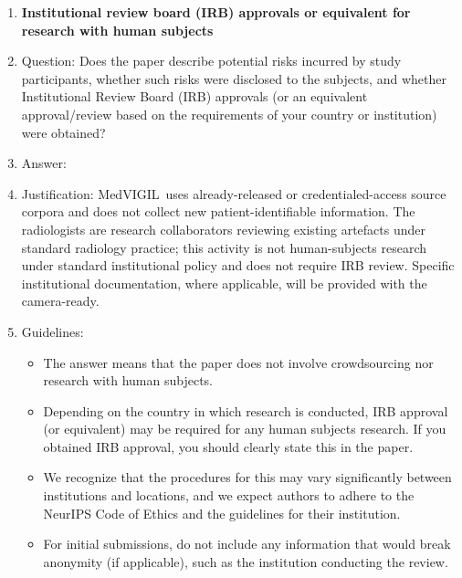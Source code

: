 \documentclass{article}
\newcommand{\medvigil}{MedVIGIL}
\begin{document}
\begin{enumerate}
\item {\bf Institutional review board (IRB) approvals or equivalent for research with human subjects}
    \item[] Question: Does the paper describe potential risks incurred by study participants, whether such risks were disclosed to the subjects, and whether Institutional Review Board (IRB) approvals (or an equivalent approval/review based on the requirements of your country or institution) were obtained?
    \item[] Answer: \answerNA{}
    \item[] Justification: \medvigil\ uses already-released or credentialed-access source corpora and does not collect new patient-identifiable information. The radiologists are research collaborators reviewing existing artefacts under standard radiology practice; this activity is not human-subjects research under standard institutional policy and does not require IRB review. Specific institutional documentation, where applicable, will be provided with the camera-ready.
    \item[] Guidelines:
    \begin{itemize}
        \item The answer \answerNA{} means that the paper does not involve crowdsourcing nor research with human subjects.
        \item Depending on the country in which research is conducted, IRB approval (or equivalent) may be required for any human subjects research. If you obtained IRB approval, you should clearly state this in the paper.
        \item We recognize that the procedures for this may vary significantly between institutions and locations, and we expect authors to adhere to the NeurIPS Code of Ethics and the guidelines for their institution.
        \item For initial submissions, do not include any information that would break anonymity (if applicable), such as the institution conducting the review.
    \end{itemize}


\end{enumerate}
\end{document}
